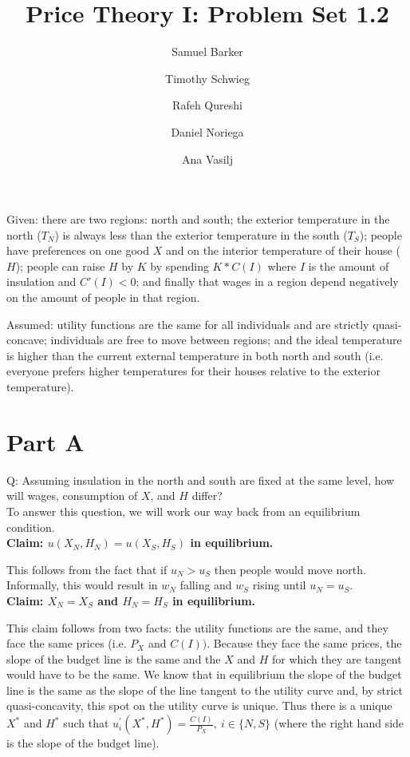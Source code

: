\documentclass[12pt]{paper}
\title{Price Theory I: Problem Set 1.2}
\author{Samuel Barker\and Timothy Schwieg\and Rafeh Qureshi\and Daniel Noriega\and Ana Vasilj}
\begin{document}
\maketitle

Given: there are two regions: north and south; the exterior temperature in the north ($T_N$) is always less than the exterior temperature in the south ($T_S$); people have preferences on one good $X$ and on the interior temperature of their house ($H$); people can raise $H$ by $K$ by spending $K*C(I)$ where $I$ is the amount of insulation and $C'(I)<0$; and finally that wages in a region depend negatively on the amount of people in that region.

Assumed: utility functions are the same for all individuals and are strictly quasi-concave; individuals are free to move between regions; and the ideal temperature is higher than the current external temperature in both north and south (i.e. everyone prefers higher temperatures for their houses relative to the exterior temperature).

\section{Part A}
Q: Assuming insulation in the north and south are fixed at the same level, how will wages, consumption of $X$, and $H$ differ?
\\

To answer this question, we will work our way back from an equilibrium condition.
\\

\textbf{Claim: $u(X_N,H_N)=u(X_S,H_S)$ in equilibrium.}

This follows from the fact that if $u_N>u_S$ then people would move north. Informally, this would result in $w_N$ falling and $w_S$ rising until $u_N=u_S$.
\\

\textbf{Claim: $X_N=X_S$ and $H_N=H_S$ in equilibrium.}

This claim follows from two facts: the utility functions are the same, and they face the same prices (i.e. $P_X$  and $C(I))$. Because they face the same prices, the slope of the budget line is the same and the $X$ and $H$ for which they are tangent would have to be the same. We know that in equilibrium the slope of the budget line is the same as the slope of the line tangent to the utility curve and, by strict quasi-concavity, this spot on the utility curve is unique. Thus there is a unique $X^*$ and $H^*$ such that $u^{'}_i(X^*,H^*)=\frac{C(I)}{P_X},~i\in  \{N,S\}$ (where the right hand side is the slope of the budget line).
\\
\end{document}
